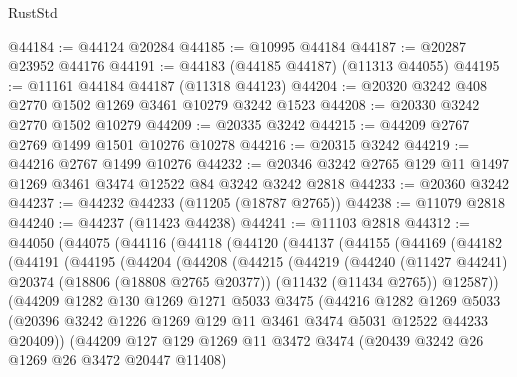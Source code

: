 \begin{lexlean}{RustStd}
\begin{coremodule}
@44184 := @44124 @20284
@44185 := @10995 @44184
@44187 := @20287 @23952 @44176
@44191 := @44183 (@44185 @44187) (@11313 @44055)
@44195 := @11161 @44184 @44187 (@11318 @44123)
@44204 := @20320 @3242 @408 @2770 @1502 @1269 @3461 @10279 @3242 @1523
@44208 := @20330 @3242 @2770 @1502 @10279
@44209 := @20335 @3242
@44215 := @44209 @2767 @2769 @1499 @1501 @10276 @10278
@44216 := @20315 @3242
@44219 := @44216 @2767 @1499 @10276
@44232 := @20346 @3242 @2765 @129 @11 @1497 @1269 @3461 @3474 @12522 @84 @3242 @3242 @2818
@44233 := @20360 @3242
@44237 := @44232 @44233 (@11205 (@18787 @2765))
@44238 := @11079 @2818
@44240 := @44237 (@11423 @44238)
@44241 := @11103 @2818
@44312 := @44050
    (@44075
      (@44116
        (@44118
          (@44120
            (@44137
              (@44155
                (@44169
                  (@44182
                    (@44191
                      (@44195
                        (@44204
                          (@44208
                            (@44215
                              (@44219
                                (@44240
                                  (@11427 @44241)
                                  @20374
                                  (@18806 (@18808 @2765 @20377))
                                  (@11432 (@11434 @2765))
                                  @12587))
                              (@44209
                                @1282
                                @130
                                @1269
                                @1271
                                @5033
                                @3475
                                (@44216
                                  @1282
                                  @1269
                                  @5033
                                  (@20396
                                    @3242
                                    @1226
                                    @1269
                                    @129
                                    @11
                                    @3461
                                    @3474
                                    @5031
                                    @12522
                                    @44233
                                    @20409))
                                (@44209
                                  @127
                                  @129
                                  @1269
                                  @11
                                  @3472
                                  @3474
                                  (@20439 @3242 @26 @1269 @26 @3472 @20447 @11408)

\end{coremodule}
\end{lexlean}
